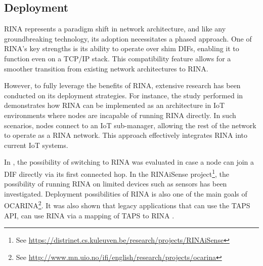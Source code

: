 \documentclass{ieeeaccess}
\begin{document}
\subsection{Deployment} 
%
RINA represents a paradigm shift in network architecture, and like any groundbreaking technology, its adoption necessitates a phased approach. One of RINA's key strengths is its ability to operate over shim DIFs, enabling it to function even on a TCP/IP stack. This compatibility feature allows for a smoother transition from existing network architectures to RINA.

However, to fully leverage the benefits of RINA, extensive research has been conducted on its deployment strategies. For instance, the study performed in \cite{maryan2020} demonstrates how RINA can be implemented as an architecture in IoT environments where nodes are incapable of running RINA directly. In such scenarios, nodes connect to an IoT sub-manager, allowing the rest of the network to operate as a RINA network. This approach effectively integrates RINA into current IoT systems.

In \cite{ciko2019first}, the possibility of switching to RINA was evaluated in case a node can join a DIF directly via its first connected hop. In the RINAiSense project\footnote{See \url{https://distrinet.cs.kuleuven.be/research/projects/RINAiSense}}, the possibility of running RINA on limited devices such as sensors has been investigated. Deployment possibilities of RINA is also one of the main goals of OCARINA\footnote{See \url{http://www.mn.uio.no/ifi/english/research/projects/ocarina}}. It was also shown that legacy applications that can use the TAPS API, can use RINA via a mapping of TAPS to RINA \cite{krist2020taps}.
\end{document}
